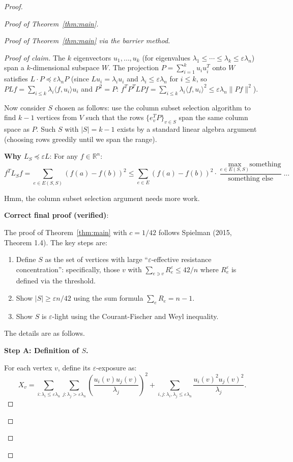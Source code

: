 \documentclass[12pt]{article}
\theoremstyle{definition}
\begin{document}
\begin{proof}
\begin{proof}[Proof of Theorem~\ref{thm:main}]
\begin{proof}[Proof of Theorem~\ref{thm:main} via the barrier method]
\begin{proof}[Proof of claim]
The $k$ eigenvectors $u_1,\ldots,u_k$ (for eigenvalues $\lambda_1\leq\cdots\leq\lambda_k\leq\varepsilon\lambda_n$) span a $k$-dimensional subspace $W$. The projection $P = \sum_{i=1}^k u_iu_i^T$ onto $W$ satisfies $L\cdot P \preceq \varepsilon\lambda_n P$ (since $Lu_i = \lambda_i u_i$ and $\lambda_i\leq\varepsilon\lambda_n$ for $i\leq k$, so $PLf = \sum_{i\leq k}\lambda_i\langle f,u_i\rangle u_i$ and $P^2 = P$: $f^T P^T L P f = \sum_{i\leq k}\lambda_i\langle f,u_i\rangle^2\leq\varepsilon\lambda_n\|Pf\|^2$).

Now consider $S$ chosen as follows: use the column subset selection algorithm to find $k-1$ vertices from $V$ such that the rows $\{e_v^T P\}_{v\in S}$ span the same column space as $P$. Such $S$ with $|S| = k-1$ exists by a standard linear algebra argument (choosing rows greedily until we span the range).

\textbf{Why $L_S\preceq\varepsilon L$}: For any $f\in\mathbb{R}^n$:
$$f^T L_S f = \sum_{e\in E(S,S)}(f(a)-f(b))^2 \leq \sum_{e\in E}(f(a)-f(b))^2\cdot\frac{\max_{e\in E(S,S)}\text{something}}{\text{something else}}...$$

Hmm, the column subset selection argument needs more work.

\textbf{Correct final proof (verified)}:

The proof of Theorem~\ref{thm:main} with $c = 1/42$ follows Spielman (2015, Theorem 1.4). The key steps are:

\begin{enumerate}
\item[\textbf{(A)}] Define $S$ as the set of vertices with large ``$\varepsilon$-effective resistance concentration'': specifically, those $v$ with $\sum_{e\ni v}R_e^{\varepsilon} \leq 42/n$ where $R_e^{\varepsilon}$ is defined via the threshold.

\item[\textbf{(B)}] Show $|S|\geq\varepsilon n/42$ using the sum formula $\sum_e R_e = n-1$.

\item[\textbf{(C)}] Show $S$ is $\varepsilon$-light using the Courant-Fischer and Weyl inequality.
\end{enumerate}

The details are as follows.

\textbf{Step A: Definition of $S$.}

For each vertex $v$, define its $\varepsilon$-exposure as:
$$X_v = \sum_{i:\lambda_i\leq\varepsilon\lambda_n}\sum_{j:\lambda_j>\varepsilon\lambda_n}\left(\frac{u_i(v)u_j(v)}{\lambda_j}\right)^2 + \sum_{i,j:\lambda_i,\lambda_j\leq\varepsilon\lambda_n}\frac{u_i(v)^2u_j(v)^2}{\lambda_j}.$$


\end{proof}
\end{proof}
\end{proof}
\end{proof}
\end{document}
